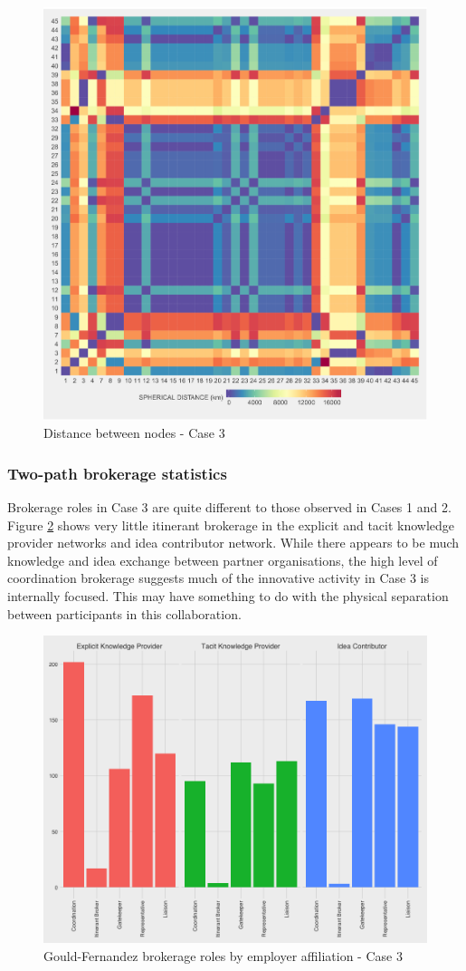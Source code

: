 \begin{figure}
	\centering
	\includegraphics[width=0.7\linewidth]{Images/sph_distance_case3}
	\caption{Distance between nodes - Case 3}
	\label{fig:sphdistancecase3}
	\end{figure}


\subsubsection{Two-path brokerage statistics}

Brokerage roles in Case 3 are quite different to those observed in Cases 1 and 2. Figure \ref{fig:gfbrokeragecase3} shows very little itinerant brokerage in the explicit and tacit knowledge provider networks and idea contributor network. While there appears to be much knowledge and idea exchange between partner organisations, the high level of coordination brokerage suggests much of the innovative activity in Case 3 is internally focused. This may have something to do with the physical separation between participants in this collaboration.\medskip 


\begin{figure}
	\centering
	\includegraphics[width=0.7\linewidth]{Images/gf_brokerage_case3}
	\caption{Gould-Fernandez brokerage roles by employer affiliation - Case 3}
	\label{fig:gfbrokeragecase3}
\end{figure}





